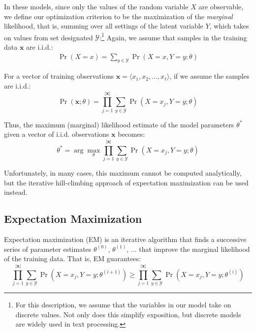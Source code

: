 In these models, since only the values of the random variable $X$ are
observable, we define our optimization criterion to be the
maximization of the \emph{marginal} likelihood, that is, summing over
all settings of the latent variable $Y$, which takes on values from
set designated $\mathcal{Y}$:\footnote{For this description, we assume
  that the variables in our model take on discrete values.  Not only
  does this simplify exposition, but discrete models are widely used
  in text processing.} Again, we assume that samples in the training
data $\textbf{x}$ are i.i.d.:
\begin{eqnarray}
\Pr(X=x) = \sum_{y \in \mathcal{Y}} \Pr(X=x,Y=y ; \theta)
\end{eqnarray}

\noindent For a vector of training observations $\textbf{x} = \langle
x_1,x_2, \ldots, x_{\ell} \rangle $, if we assume the samples are
i.i.d.:
\begin{equation}
\Pr(\textbf{x};\theta) = \prod_{j=1}^{|\textbf{x}|} \sum_{y \in \mathcal{Y}} \Pr(X=x_j,Y=y ; \theta)
\end{equation}

\noindent Thus, the maximum (marginal) likelihood estimate of the
model parameters $\theta^*$ given a vector of i.i.d. observations
$\textbf{x}$ becomes:
\begin{equation}
\theta^* = \arg \max_{\theta} \prod_{j=1}^{|\textbf{x}|} \sum_{y \in \mathcal{Y}} \Pr(X=x_j,Y=y ; \theta)
\end{equation}

\noindent Unfortunately, in many cases, this maximum cannot be
computed analytically, but the iterative hill-climbing approach of
expectation maximization can be used instead.

\subsection{Expectation Maximization}

Expectation maximization (EM) is an iterative algorithm that finds a
successive series of parameter estimates $\theta^{(0)}$,
$\theta^{(1)}$, $\ldots$ that improve the marginal likelihood of the
training data.  That is, EM guarantees:
\begin{equation}
\prod_{j=1}^{|\textbf{x}|} \sum_{y \in \mathcal{Y}} \Pr(X=x_j,Y=y ; \theta^{(i+1)}) \ge \prod_{j=1}^{|\textbf{x}|} \sum_{y \in \mathcal{Y}} \Pr(X=x_j,Y=y ; \theta^{(i)})
\end{equation}

